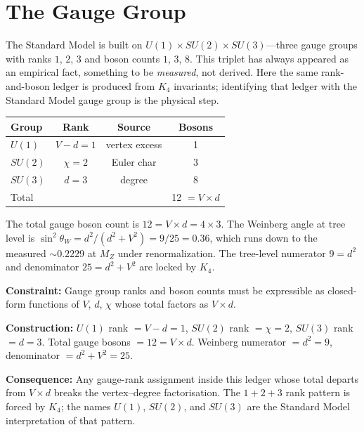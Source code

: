 \documentclass[11pt,a4paper]{book}
\newcommand{\VoidRef}[2]{\textit{#2} (in \textit{Void})}
\begin{document}
\chapter{The Gauge Group}
\label{ch:gauge-group}

The Standard Model is built on $U(1) \times SU(2) \times SU(3)$---three gauge groups with ranks $1$, $2$, $3$ and boson counts $1$, $3$, $8$. This triplet has always appeared as an empirical fact, something to be \emph{measured}, not derived. Here the same rank-and-boson ledger is produced from $K_4$ invariants; identifying that ledger with the Standard Model gauge group is the physical step.

\begin{center}
\begin{tabular}{lccc}
\toprule
Group    & Rank             & Source          & Bosons \\
\midrule
$U(1)$   & $V - d = 1$      & vertex excess   & 1 \\
$SU(2)$  & $\chi = 2$       & Euler char      & 3 \\
$SU(3)$  & $d = 3$          & degree          & 8 \\
\midrule
Total    &                  &                 & 12 $= V \times d$ \\
\bottomrule
\end{tabular}
\end{center}

The total gauge boson count is $12 = V \times d = 4 \times 3$. The Weinberg angle at tree level is $\sin^2\theta_W = d^2/(d^2 + V^2) = 9/25 = 0.36$, which runs down to the measured $\sim 0.2229$ at $M_Z$ under renormalization. The tree-level numerator $9 = d^2$ and denominator $25 = d^2 + V^2$ are locked by $K_4$.


\textbf{Constraint:} Gauge group ranks and boson counts must be expressible as closed-form functions of $V$, $d$, $\chi$ whose total factors as $V \times d$.

\textbf{Construction:} $U(1)$ rank $= V - d = 1$, $SU(2)$ rank $= \chi = 2$, $SU(3)$ rank $= d = 3$. Total gauge bosons $= 12 = V \times d$. Weinberg numerator $= d^2 = 9$, denominator $= d^2 + V^2 = 25$.

\textbf{Consequence:} Any gauge-rank assignment inside this ledger whose total departs from $V \times d$ breaks the vertex--degree factorisation. The $1+2+3$ rank pattern is forced by $K_4$; the names $U(1)$, $SU(2)$, and $SU(3)$ are the Standard Model interpretation of that pattern.
\end{document}
